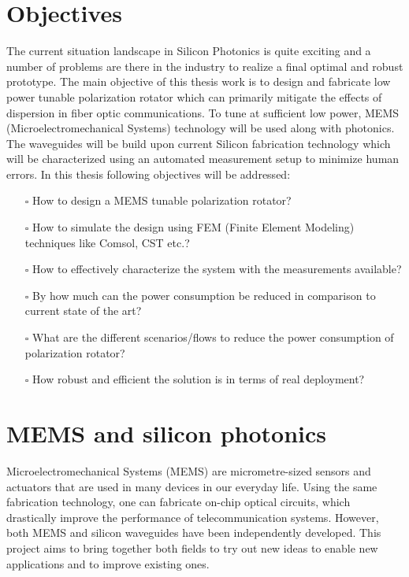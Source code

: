 \documentclass[../report.tex]{subfiles}
\begin{document}
	\section{Objectives}
The current situation landscape in Silicon Photonics is quite exciting and a number of problems are there in the industry to realize a final optimal and robust prototype. The main objective of this thesis work is to design and fabricate low power tunable polarization rotator which can primarily mitigate the effects of dispersion in fiber optic communications. To tune at sufficient low power, MEMS (Microelectromechanical Systems) technology will be used along with photonics. The waveguides will be build upon current Silicon fabrication technology which will be characterized using an automated measurement setup to minimize human errors. In this thesis following objectives will be addressed:
\begin{itemize}
	\item[$\square$] How to design a MEMS tunable polarization rotator?
	\item[$\square$]  How to simulate the design using FEM (Finite Element Modeling) techniques like Comsol, CST etc.?
	\item[$\square$]  How to effectively characterize the system with the measurements available?
	\item[$\square$]  By how much can the power consumption be reduced in comparison to current state of the art?
	\item[$\square$]  What are the different scenarios/flows to reduce the power consumption of polarization rotator?
	\item[$\square$]  How robust and efficient the solution is in terms of real deployment?
\end{itemize}

	\section{MEMS and silicon photonics}
Microelectromechanical Systems (MEMS) are micrometre-sized sensors and actuators that are used in many devices in our everyday life. Using the same fabrication technology, one can fabricate on-chip optical circuits, which drastically improve the performance of telecommunication systems. However, both MEMS and silicon waveguides have been independently developed. This project aims to bring together both fields to try out new ideas to enable new applications and to improve existing ones. 
	
\end{document}
